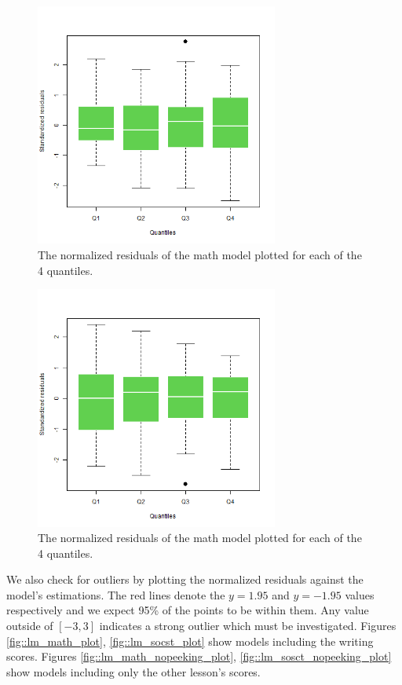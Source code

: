 \documentclass[10pt, a4paper]{article}
\begin{document}
	\begin{figure}
		\includegraphics[width=8cm]{lm_math_nopeeking_residual_boxplot.png}
		\centering
		\caption{The normalized residuals of the math model plotted for each of the 4 quantiles. }
		\label{fig::lm_math_nopeeking_boxplot}
	\end{figure}

	\begin{figure}
		\includegraphics[width=8cm]{lm_socst_nopeeking_residual_boxplot.png}
		\centering
		\caption{The normalized residuals of the math model plotted for each of the 4 quantiles. }
		\label{fig::lm_socst_nopeeking_boxplot}
	\end{figure}


	We also check for outliers by plotting the normalized residuals against the model's estimations. The red lines denote the $y=1.95$ and $y=-1.95$ values respectively and we expect 95\% of the points to be within them. Any value outside of $[-3,3]$ indicates a strong outlier which must be investigated. Figures \ref{fig::lm_math_plot}, \ref{fig::lm_socst_plot} show models including the writing scores. Figures \ref{fig::lm_math_nopeeking_plot}, \ref{fig::lm_sosct_nopeeking_plot} show models including only the other lesson's scores.
	
\end{document}

